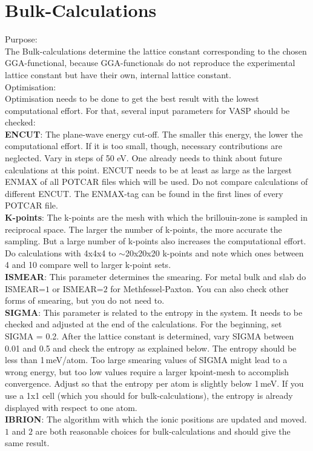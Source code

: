 \documentclass[twoside, 11pt, titlepage, captions=nooneline, a4paper, headsepline]{scrbook}%
\newcommand{\9}{\mathrm}
\newcommand{\0}{\,\mathrm}
\begin{document}
\section{Bulk-Calculations}
\label{bulk}
Purpose:\\
The Bulk-calculations determine the lattice constant corresponding to the chosen GGA-functional, because GGA-functionals do not reproduce the experimental lattice constant but have their own, internal lattice constant.\\
Optimisation:\\
Optimisation needs to be done to get the best result with the lowest computational effort. For that, several input parameters for VASP should be checked:\\
\textbf{ENCUT}: The plane-wave energy cut-off. The smaller this energy, the lower the computational effort. If it is too small, though, necessary contributions are neglected. Vary in steps of 50 eV. One already needs to think about future calculations at this point. ENCUT needs to be at least as large as the largest ENMAX of all POTCAR files which will be used. Do not compare calculations of different ENCUT. The ENMAX-tag can be found in the first lines of every POTCAR file.\\
\textbf{K-points}: The k-points are the mesh with which the brillouin-zone is sampled in reciprocal space. The larger the number of k-points, the more accurate the sampling. But a large number of k-points also increases the computational effort. Do calculations with 4x4x4 to $\sim$20x20x20 k-points and note which ones between 4 and 10 compare well to larger k-point sets.\\
\textbf{ISMEAR}: This parameter determines the smearing. For metal bulk and slab do ISMEAR=$1$ or ISMEAR=$2$ for Methfessel-Paxton. You can also check other forms of smearing, but you do not need to.\\
\textbf{SIGMA}: This parameter is related to the entropy in the system. It needs to be checked and adjusted at the end of the calculations. For the beginning, set SIGMA = 0.2. After the lattice constant is determined, vary SIGMA between 0.01 and 0.5 and check the entropy as explained below. The entropy should be less than 1\,meV/atom. Too large smearing values of SIGMA might lead to a wrong energy, but too low values require a larger kpoint-mesh to accomplish convergence. Adjust so that the entropy per atom is slightly below 1\,meV. If you use a 1x1 cell (which you should for bulk-calculations), the entropy is already displayed with respect to one atom.\\
\textbf{IBRION}: The algorithm with which the ionic positions are updated and moved. $1$ and $2$ are both reasonable choices for bulk-calculations and should give the same result.\\
\end{document}
